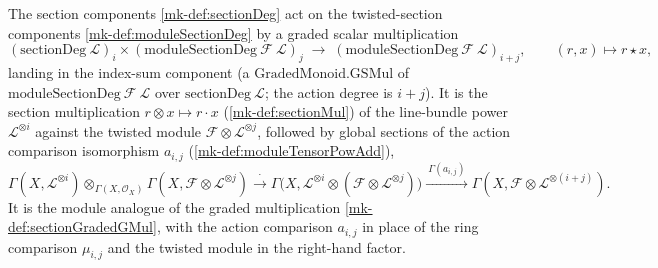 \begin{definition}
  \label{mk-def:moduleSectionGradedGSMul}

  The section components \ref{mk-def:sectionDeg} act on the twisted-section components
  \ref{mk-def:moduleSectionDeg} by a graded scalar multiplication
  \[
    (\mathrm{sectionDeg}\ \mathcal{L})_i \times
      (\mathrm{moduleSectionDeg}\ \mathcal{F}\ \mathcal{L})_j
    \;\longrightarrow\; (\mathrm{moduleSectionDeg}\ \mathcal{F}\ \mathcal{L})_{i+j},
    \qquad (r, x) \longmapsto r \star x,
  \]
  landing in the index-sum component (a \(\mathrm{GradedMonoid.GSMul}\) of
  \(\mathrm{moduleSectionDeg}\ \mathcal{F}\ \mathcal{L}\) over
  \(\mathrm{sectionDeg}\ \mathcal{L}\); the action degree is \(i+j\)). It is the section multiplication
  \(r \otimes x \mapsto r \cdot x\) (\ref{mk-def:sectionMul}) of the line-bundle power
  \(\mathcal{L}^{\otimes i}\) against the twisted module
  \(\mathcal{F} \otimes \mathcal{L}^{\otimes j}\), followed by global sections of the
  action comparison isomorphism \(a_{i,j}\) (\ref{mk-def:moduleTensorPowAdd}),
  \[
    \Gamma(X, \mathcal{L}^{\otimes i}) \otimes_{\Gamma(X,\mathcal{O}_X)}
      \Gamma(X, \mathcal{F} \otimes \mathcal{L}^{\otimes j})
    \xrightarrow{\ \cdot\ }
    \Gamma\bigl(X, \mathcal{L}^{\otimes i} \otimes
      (\mathcal{F} \otimes \mathcal{L}^{\otimes j})\bigr)
    \xrightarrow{\ \Gamma(a_{i,j})\ }
    \Gamma(X, \mathcal{F} \otimes \mathcal{L}^{\otimes (i+j)}).
  \]
  It is the module analogue of the graded multiplication \ref{mk-def:sectionGradedGMul},
  with the action comparison \(a_{i,j}\) in place of the ring comparison
  \(\mu_{i,j}\) and the twisted module in the right-hand factor.
\end{definition}

